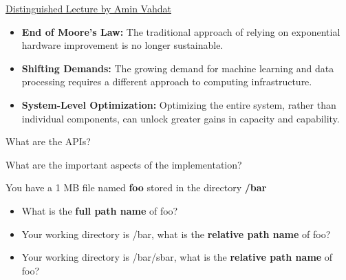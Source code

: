 \begin{slide}


    \href{https://youtu.be/9lBbqH_1KS4?feature=shared}
           {Distinguished Lecture by Amin Vahdat}
    \bigskip

    \begin{itemize}
        \item \textbf{End of Moore's Law:} The traditional approach of relying on exponential hardware improvement is no longer sustainable.
        \item \textbf{Shifting Demands:} The growing demand for machine learning and data processing requires a different approach to computing infrastructure.
        \item \textbf{System-Level Optimization:} Optimizing the entire system, rather than individual components, can unlock greater gains in capacity and capability.
    \end{itemize}

\end{slide}

\begin{slide}


    What are the APIs?
    \bigskip

    What are the important aspects of the implementation?

\end{slide}

\begin{slide}


    You have a 1 MB file named \textbf{foo} stored in the directory \textbf{/bar}
    \begin{itemize}
        \item What is the \textbf{full path name} of foo?
		\item Your working directory is /bar, what is the \textbf{relative path name} of foo?
		\item Your working directory is /bar/sbar, what is the \textbf{relative path name} of foo?
    \end{itemize}
\end{slide}

